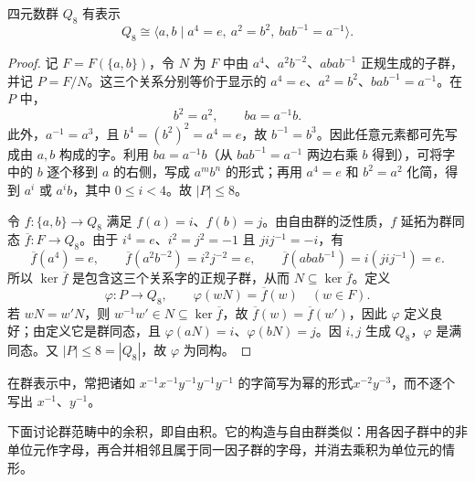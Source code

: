 \begin{example}\label{ex:quaternion-presentation}
四元数群 $Q_8$ 有表示
\[
  Q_8\cong\langle a,b\mid a^4=e,\ a^2=b^2,\ bab^{-1}=a^{-1}\rangle.
\]
\begin{proof}
记 $F=F(\{a,b\})$，令 $N$ 为 $F$ 中由 $a^4$、$a^2b^{-2}$、$abab^{-1}$ 正规生成的子群，并记 $P=F/N$。这三个关系分别等价于显示的 $a^4=e$、$a^2=b^2$、$bab^{-1}=a^{-1}$。在 $P$ 中，
\[
  b^2=a^2,\qquad ba=a^{-1}b.
\]
此外，$a^{-1}=a^3$，且 $b^4=(b^2)^2=a^4=e$，故 $b^{-1}=b^3$。因此任意元素都可先写成由 $a,b$ 构成的字。利用 $ba=a^{-1}b$（从 $bab^{-1}=a^{-1}$ 两边右乘 $b$ 得到），可将字中的 $b$ 逐个移到 $a$ 的右侧，写成 $a^m b^n$ 的形式；再用 $a^4=e$ 和 $b^2=a^2$ 化简，得到 $a^i$ 或 $a^ib$，其中 $0\leq i<4$。故 $|P|\leq8$。

令 $f:\{a,b\}\to Q_8$ 满足 $f(a)=i$、$f(b)=j$。由自由群的泛性质，$f$ 延拓为群同态 $\overline f:F\to Q_8$。由于 $i^4=e$、$i^2=j^2=-1$ 且 $jij^{-1}=-i$，有
\[
  \overline f(a^4)=e,\qquad
  \overline f(a^2b^{-2})=i^2j^{-2}=e,\qquad
  \overline f(abab^{-1})=i(jij^{-1})=e.
\]
所以 $\ker\overline f$ 是包含这三个关系字的正规子群，从而 $N\subseteq\ker\overline f$。定义
\[
  \varphi:P\longrightarrow Q_8,\qquad
  \varphi(wN)=\overline f(w)\quad(w\in F).
\]
若 $wN=w'N$，则 $w^{-1}w'\in N\subseteq\ker\overline f$，故 $\overline f(w)=\overline f(w')$，因此 $\varphi$ 定义良好；由定义它是群同态，且 $\varphi(aN)=i$、$\varphi(bN)=j$。因 $i,j$ 生成 $Q_8$，$\varphi$ 是满同态。又 $|P|\leq8=|Q_8|$，故 $\varphi$ 为同构。
\end{proof}
\end{example}

\begin{purplenote}
在群表示中，常把诸如 $x^{-1}x^{-1}y^{-1}y^{-1}y^{-1}$ 的字简写为幂的形式$x^{-2}y^{-3}$，而不逐个写出 $x^{-1}$、$y^{-1}$。
\end{purplenote}

\begin{purplenote}
下面讨论群范畴中的余积，即自由积。它的构造与自由群类似：用各因子群中的非单位元作字母，再合并相邻且属于同一因子群的字母，并消去乘积为单位元的情形。
\end{purplenote}

